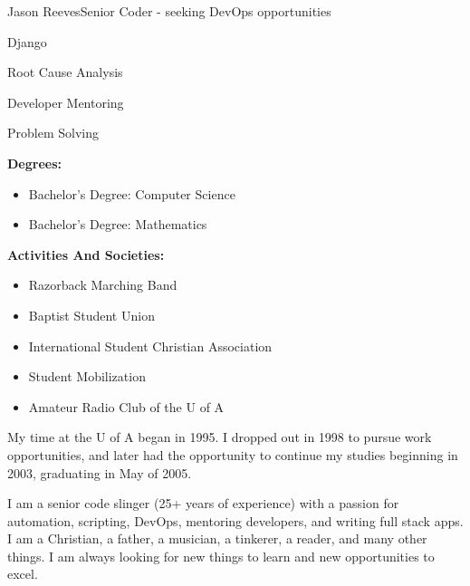 \documentclass{article}
\begin{document}
\begin{cv}[avatar]{Jason Reeves}{Senior Coder - seeking DevOps opportunities}
\cvseparator
\begin{cvitem}
    Django
\end{cvitem}

\cvseparator
\begin{cvitem}
    Root Cause Analysis
\end{cvitem}

\cvseparator
\begin{cvitem}
    Developer Mentoring
\end{cvitem}

\cvseparator
\begin{cvitem}
    Problem Solving
\end{cvitem}

\textbf{Degrees:}
\begin{itemize}
  \item Bachelor's Degree: Computer Science
  \item Bachelor's Degree: Mathematics
\end{itemize}
\vspace*{3mm}
\textbf{Activities And Societies:}
\begin{itemize}
  \item Razorback Marching Band
  \item Baptist Student Union
  \item International Student Christian Association
  \item Student Mobilization
  \item Amateur Radio Club of the U of A
\end{itemize}
\vspace*{3mm}
My time at the U of A began in 1995. I dropped out in 1998 to pursue work opportunities, and later had the opportunity to continue my studies beginning in 2003, graduating in May of 2005.


\switchcolumn
\renewcommand{\iscvsidebar}{0}

I am a senior code slinger (25+ years of experience) with a passion for automation, scripting, DevOps, mentoring developers, and writing full stack apps. I am a Christian, a father, a musician, a tinkerer, a reader, and many other things. I am always looking for new things to learn and new opportunities to excel.
\vspace*{3mm}


\end{cv}
\end{document}
